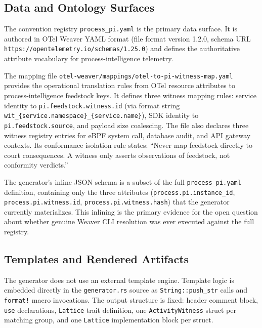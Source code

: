 \subsection{Data and Ontology Surfaces}
\label{sec:otel-weaver-exp-004-registry-to-witness-data}

The convention registry \texttt{process\_pi.yaml} is the primary data surface. It is
authored in OTel Weaver YAML format (file format version 1.2.0, schema URL
\texttt{https://opentelemetry.io/schemas/1.25.0}) and defines the authoritative attribute
vocabulary for process-intelligence telemetry.

The mapping file \texttt{otel-weaver/mappings/otel-to-pi-witness-map.yaml} provides the
operational translation rules from OTel resource attributes to process-intelligence
feedstock keys. It defines three witness mapping rules: service identity to
\texttt{pi.feedstock.witness.id} (via format string \texttt{wit\_\{service.namespace\}\_\{service.name\}}),
SDK identity to \texttt{pi.feedstock.source}, and payload size coalescing. The file also
declares three witness registry entries for eBPF system call, database audit, and API
gateway contexts. Its conformance isolation rule states: ``Never map feedstock directly to
court consequences. A witness only asserts observations of feedstock, not conformity
verdicts.''

The generator's inline JSON schema is a subset of the full \texttt{process\_pi.yaml}
definition, containing only the three attributes (\texttt{process.pi.instance\_id},
\texttt{process.pi.witness.id}, \texttt{process.pi.witness.hash}) that the generator
currently materializes. This inlining is the primary evidence for the open question about
whether genuine Weaver CLI resolution was ever executed against the full registry.

\subsection{Templates and Rendered Artifacts}
\label{sec:otel-weaver-exp-004-registry-to-witness-templates}

The generator does not use an external template engine. Template logic is embedded directly
in the \texttt{generator.rs} source as \texttt{String::push\_str} calls and
\texttt{format!} macro invocations. The output structure is fixed: header comment block,
\texttt{use} declarations, \texttt{Lattice} trait definition, one \texttt{ActivityWitness}
struct per matching group, and one \texttt{Lattice} implementation block per struct.

